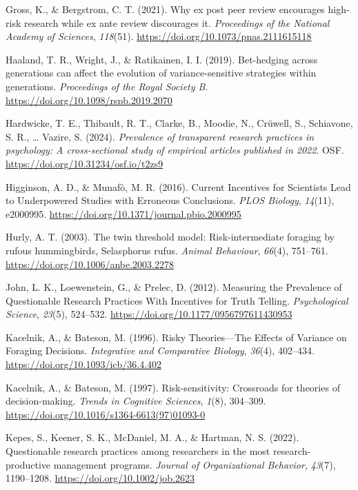\documentclass[
  british,
  a4paper,
  ,man,mask,floatsintext]{apa6}
\newlength{\cslhangindent}
\newenvironment{CSLReferences}[2] %
 {\begin{list}{}{%
  \setlength{\itemindent}{0pt}
  \setlength{\leftmargin}{0pt}
  \setlength{\parsep}{0pt}
  \ifodd #1
   \setlength{\leftmargin}{\cslhangindent}
   \setlength{\itemindent}{-1\cslhangindent}
  \fi
  \setlength{\itemsep}{#2\baselineskip}}}
 {\end{list}}
\begin{document}
\begin{CSLReferences}{1}{0}
Gross, K., \& Bergstrom, C. T. (2021). Why ex post peer review encourages high-risk research while ex ante review discourages it. \emph{Proceedings of the National Academy of Sciences}, \emph{118}(51). \url{https://doi.org/10.1073/pnas.2111615118}

Haaland, T. R., Wright, J., \& Ratikainen, I. I. (2019). Bet-hedging across generations can affect the evolution of variance-sensitive strategies within generations. \emph{Proceedings of the Royal Society B}. \url{https://doi.org/10.1098/rspb.2019.2070}

Hardwicke, T. E., Thibault, R. T., Clarke, B., Moodie, N., Crüwell, S., Schiavone, S. R., \ldots{} Vazire, S. (2024). \emph{Prevalence of transparent research practices in psychology: {A} cross-sectional study of empirical articles published in 2022}. OSF. \url{https://doi.org/10.31234/osf.io/t2zs9}

Higginson, A. D., \& Munafò, M. R. (2016). Current {Incentives} for {Scientists Lead} to {Underpowered Studies} with {Erroneous Conclusions}. \emph{PLOS Biology}, \emph{14}(11), e2000995. \url{https://doi.org/10.1371/journal.pbio.2000995}

Hurly, A. T. (2003). The twin threshold model: Risk-intermediate foraging by rufous hummingbirds, {Selasphorus} rufus. \emph{Animal Behaviour}, \emph{66}(4), 751--761. \url{https://doi.org/10.1006/anbe.2003.2278}

John, L. K., Loewenstein, G., \& Prelec, D. (2012). Measuring the {Prevalence} of {Questionable Research Practices With Incentives} for {Truth Telling}. \emph{Psychological Science}, \emph{23}(5), 524--532. \url{https://doi.org/10.1177/0956797611430953}

Kacelnik, A., \& Bateson, M. (1996). Risky {Theories}---{The Effects} of {Variance} on {Foraging Decisions}. \emph{Integrative and Comparative Biology}, \emph{36}(4), 402--434. \url{https://doi.org/10.1093/icb/36.4.402}

Kacelnik, A., \& Bateson, M. (1997). Risk-sensitivity: Crossroads for theories of decision-making. \emph{Trends in Cognitive Sciences}, \emph{1}(8), 304--309. \url{https://doi.org/10.1016/s1364-6613(97)01093-0}

Kepes, S., Keener, S. K., McDaniel, M. A., \& Hartman, N. S. (2022). Questionable research practices among researchers in the most research-productive management programs. \emph{Journal of Organizational Behavior}, \emph{43}(7), 1190--1208. \url{https://doi.org/10.1002/job.2623}


\end{CSLReferences}
\end{document}
